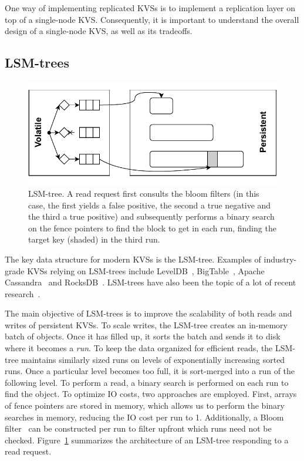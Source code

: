 One way of implementing replicated \acp{KVS} is to implement a
replication layer on top of a single-node \ac{KVS}. Consequently,
it is important to understand the overall design of a single-node
\ac{KVS}, as well as its tradeoffs.

\subsection{\acfp{LSM-tree}}

\begin{figure}[t]
    \centering
    \includegraphics[width=\linewidth]{img/lsm_read}
    \caption{\acf{LSM-tree}. A read request first consults the
    bloom filters (in this case, the first yields a false
    positive, the second a true negative and the third a true
    positive) and subsequently performs a binary search on the
    fence pointers to find the block to get in each run, finding
    the target key (shaded) in the third
    run.}\label{fig:lsm_read}
\end{figure}

The key data structure for modern \acp{KVS} is the \acf{LSM-tree}.
Examples of industry-grade \acp{KVS} relying on \acp{LSM-tree} include
LevelDB~\cite{leveldb},
BigTable~\cite{bigtable}, Apache Cassandra~\cite{cassandra} and
RocksDB~\cite{rocksdb}. \acp{LSM-tree} have also been the topic of
a lot of recent research~\cite{lsm1,lsm2,lsm3,lsm4}.


The main objective of \acp{LSM-tree} is to improve the
scalability of both reads and writes of persistent \acp{KVS}. To
scale writes, the \ac{LSM-tree} creates an in-memory batch of
objects. Once it has filled up, it sorts the batch and sends it
to disk where it becomes a \emph{run}. To keep the data organized
for efficient reads, the \ac{LSM-tree} maintains similarly sized
runs on levels of exponentially increasing sorted runs. Once a
particular level becomes too full, it is sort-merged into a run
of the following level. To perform a read, a binary search is
performed on each run to find the object. To optimize IO costs,
two approaches are employed. First, arrays of fence pointers are
stored in memory, which allows us to perform the binary searches
in memory, reducing the IO cost per run to 1. Additionally, a
Bloom filter~\cite{bloom} can be constructed per run to filter
upfront which runs need not be checked. Figure~\ref{fig:lsm_read}
summarizes the architecture of an \ac{LSM-tree} responding to a
read request.


